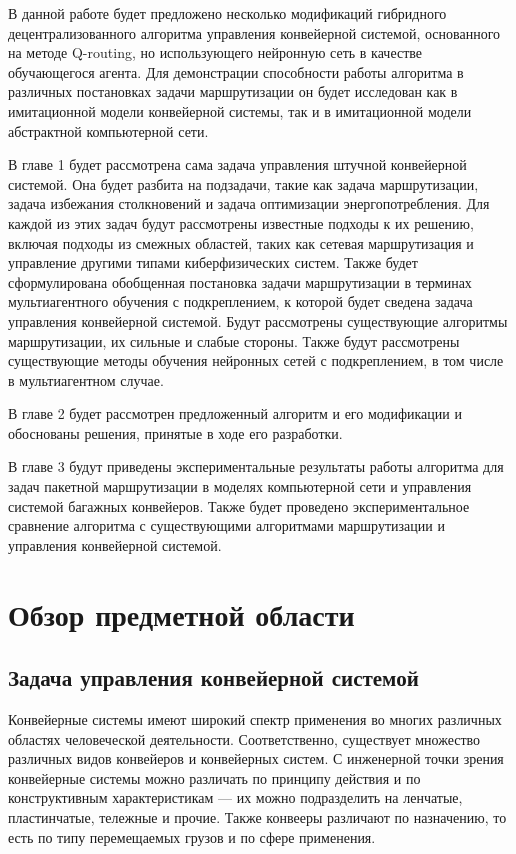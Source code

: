 \documentclass[specification,annotation,times]{itmo-student-thesis}
\theoremstyle{definition}
\begin{document}
В данной работе будет предложено несколько модификаций гибридного децентрализованного
алгоритма управления конвейерной системой, основанного на методе Q-routing, но
использующего нейронную сеть в качестве обучающегося агента. Для демонстрации
способности работы алгоритма в различных постановках задачи маршрутизации он
будет исследован как в имитационной модели конвейерной системы, так и в
имитационной модели абстрактной компьютерной сети.

В главе 1 будет рассмотрена сама задача управления штучной конвейерной системой.
Она будет разбита на подзадачи, такие как задача маршрутизации, задача
избежания столкновений и задача оптимизации энергопотребления. Для каждой из
этих задач будут рассмотрены известные подходы к их решению, включая подходы
из смежных областей, таких как сетевая маршрутизация и управление другими типами
киберфизических систем. Также будет сформулирована обобщенная постановка
задачи маршрутизации в терминах мультиагентного обучения с подкреплением, к
которой будет сведена задача управления конвейерной системой. Будут рассмотрены
существующие алгоритмы маршрутизации, их сильные и слабые стороны. Также будут
рассмотрены существующие методы обучения нейронных сетей с подкреплением, в том
числе в мультиагентном случае.

В главе 2 будет рассмотрен предложенный алгоритм и его модификации и обоснованы
решения, принятые в ходе его разработки.

В главе 3 будут приведены экспериментальные результаты работы алгоритма для
задач пакетной маршрутизации в моделях компьютерной сети и управления системой багажных
конвейеров. Также будет проведено экспериментальное сравнение алгоритма с
существующими алгоритмами маршрутизации и управления конвейерной системой.

\chapter{Обзор предметной области}

\startrelatedwork

\section{Задача управления конвейерной системой}\label{problem-statement}

Конвейерные системы имеют широкий спектр применения во многих различных областях
человеческой деятельности. Соответственно, существует множество различных видов
конвейеров и конвейерных систем. С инженерной точки зрения конвейерные системы
можно различать по принципу действия и по конструктивным характеристикам
--- их можно подразделить на ленчатые, пластинчатые, тележные и прочие.
Также конвееры различают по назначению, то есть по типу перемещаемых грузов и по
сфере применения.
\end{document}
